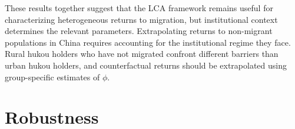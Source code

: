 \documentclass[12pt]{article}
\begin{document}

These results together suggest that the LCA framework remains useful for characterizing heterogeneous returns to migration, but institutional context determines the relevant parameters.
Extrapolating returns to non-migrant populations in China requires accounting for the institutional regime they face.
Rural hukou holders who have not migrated confront different barriers than urban hukou holders, and counterfactual returns should be extrapolated using group-specific estimates of $\phi$.






\FloatBarrier
\section{Robustness}\label{sec:robustness}



\end{document}
